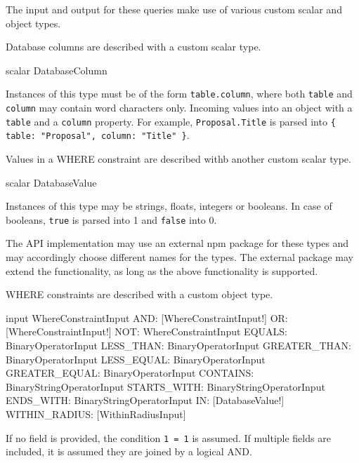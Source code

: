 The input and output for these queries make use of various custom scalar and object types.


Database columns are described with a custom scalar type.

\begin{code}
scalar DatabaseColumn
\end{code}

Instances of this type must be of the form \verb|table.column|, where both \verb|table| and \verb|column| may contain word characters only. Incoming values into an object with a \verb|table| and a \verb|column| property. For example, \verb|Proposal.Title| is parsed into \verb|{ table: "Proposal", column: "Title" }|.


Values in a WHERE constraint are described withb another custom scalar type.

\begin{code}
scalar DatabaseValue
\end{code}

Instances of this type may be strings, floats, integers or booleans. In case of booleans, \verb|true| is parsed into 1 and \verb|false| into 0.

\begin{note}
The API implementation may use an external npm package for these types and may accordingly choose different names for the types. The external package may extend the functionality, as long as the above functionality is supported.
\end{note}


WHERE constraints are described with a custom object type.

\begin{code}
input WhereConstraintInput {
    AND: [WhereConstraintInput!]
    OR: [WhereConstraintInput!]
    NOT: WhereConstraintInput
    EQUALS: BinaryOperatorInput
    LESS_THAN: BinaryOperatorInput
    GREATER_THAN: BinaryOperatorInput
    LESS_EQUAL: BinaryOperatorInput
    GREATER_EQUAL: BinaryOperatorInput
    CONTAINS: BinaryStringOperatorInput
    STARTS_WITH: BinaryStringOperatorInput
    ENDS_WITH: BinaryStringOperatorInput
    IN: [DatabaseValue!]
    WITHIN_RADIUS: [WithinRadiusInput]
}
\end{code}

If no field is provided, the condition \verb|1 = 1| is assumed. If multiple fields are included, it is assumed they are joined by a logical AND.

